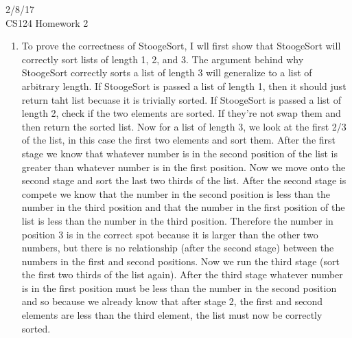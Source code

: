 \documentclass{article}
\begin{document}
	
 \hspace{5.5in} 2/8/17\\
CS124 Homework 2 \\

\begin{enumerate}
	\item To prove the correctness of StoogeSort, I wll first show that StoogeSort will correctly sort lists of length 1, 2, and 3.  The argument behind why StoogeSort correctly sorts a list of length 3 will generalize to a list of arbitrary length.  If StoogeSort is passed a list of length 1, then it should just return taht list becuase it is trivially sorted.  If StoogeSort is passed a list of length 2, check if the two elements are sorted.  If they're not swap them and then return the sorted list.  Now for a list of length 3, we look at the first 2/3 of the list, in this case the first two elements and sort them.  After the first stage we know that whatever number is in the second position of the list is greater than whatever number is in the first position.  Now we move onto the second stage and sort the last two thirds of the list.  After the second stage is compete we know that the number in the second position is less than the number in the third position and that the number in the first position of the list is less than the number in the third position.  Therefore the number in position 3 is in the correct spot because it is larger than the other two numbers, but there is no relationship (after the second stage) between the numbers in the first and second positions.  Now we run the third stage (sort the first two thirds of the list again).  After the third stage whatever number is in the first position must be less than the number in the second position and so because we already know that after stage 2, the first and second elements are less than the third element, the list must now be correctly sorted. \\
	\\

\end{enumerate}
\end{document}

